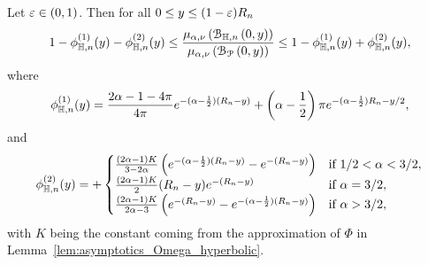 \begin{lemma}\label{lem:average_degree_hyperbolic}
Let $\varepsilon \in (0, 1)$. Then for all $0 \le y \le (1 - \varepsilon)R_n$
\[
	 1 - \phi_{\mathbb{H},n}^{(1)}(y) - \phi_{\mathbb{H},n}^{(2)}(y) \le \frac{\mu_{\alpha,\nu}\left({\mathcal B}_{\mathbb{H},n}\left(0,y\right)\right)}{\mu_{\alpha,\nu}\left({\mathcal B}_{{\mathcal P}}\left(0,y\right)\right)} 
	 \le 1 - \phi_{\mathbb{H},n}^{(1)}(y) + \phi_{\mathbb{H},n}^{(2)}(y),
\]
where
\[
	\phi_{\mathbb{H},n}^{(1)}(y) = \frac{2\alpha - 1 - 4\pi}{4\pi} e^{-(\alpha - \frac{1}{2})(R_n - y)} 
		+ \left(\alpha - \frac{1}{2}\right)\pi e^{-(\alpha - \frac{1}{2})R_n - y/2},
\]
and
\[
	\phi_{\mathbb{H},n}^{(2)}(y) = 
	+ \begin{cases}
			\frac{(2\alpha - 1)K}{3 - 2\alpha}\left(e^{-(\alpha - \frac{1}{2})(R_n - y)} - e^{-(R_n - y)}\right)
			&\mbox{if } 1/2 < \alpha < 3/2,\\
			\frac{(2\alpha -1)K}{2} (R_n - y)e^{-(R_n - y)} &\mbox{if } \alpha = 3/2,\\
			\frac{(2\alpha - 1)K}{2\alpha - 3} \left(e^{-(R_n - y)} - e^{-(\alpha - \frac{1}{2})(R_n - y)}\right)
			&\mbox{if } \alpha > 3/2,
		\end{cases}
\]
with $K$ being the constant coming from the approximation of $\Phi$ in Lemma~\ref{lem:asymptotics_Omega_hyperbolic}.
\end{lemma}

